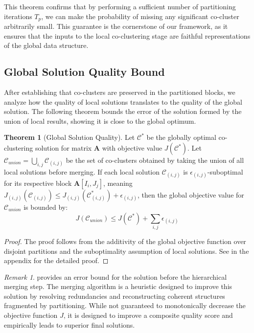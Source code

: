 \documentclass[journal]{IEEEtran}
\theoremstyle{definition}
\newtheorem{theorem}{Theorem}
\theoremstyle{remark} %
\newtheorem{remark}{Remark}
\begin{document}
{This theorem confirms that by performing a sufficient number of partitioning iterations $T_p$, we can make the probability of missing any significant co-cluster arbitrarily small. This guarantee is the cornerstone of our framework, as it ensures that the inputs to the local co-clustering stage are faithful representations of the global data structure.

\subsection{Global Solution Quality Bound}
\label{subsec:global-solution-quality-bound}
After establishing that co-clusters are preserved in the partitioned blocks, we analyze how the quality of local solutions translates to the quality of the global solution. The following theorem bounds the error of the solution formed by the union of local results, showing it is close to the global optimum.

\begin{theorem}[Global Solution Quality]
    \label{thm:global-solution-quality}
    Let $\mathcal{C}^*$ be the globally optimal co-clustering solution for matrix $\mathbf{A}$ with objective value $J(\mathcal{C}^*)$. Let $\mathcal{C}_{union} = \bigcup_{i,j} \mathcal{C}_{(i,j)}$ be the set of co-clusters obtained by taking the union of all local solutions before merging. If each local solution $\mathcal{C}_{(i,j)}$ is $\epsilon_{(i,j)}$-suboptimal for its respective block $\mathbf{A}[I_i, J_j]$, meaning $J_{(i,j)}(\mathcal{C}_{(i,j)}) \le J_{(i,j)}(\mathcal{C}_{(i,j)}^*) + \epsilon_{(i,j)}$, then the global objective value for $\mathcal{C}_{union}$ is bounded by:
    \begin{equation}
        J(\mathcal{C}_{union}) \le J(\mathcal{C}^*) + \sum_{i,j} \epsilon_{(i,j)}
    \end{equation}
\end{theorem}
\begin{proof}
    The proof follows from the additivity of the global objective function over disjoint partitions and the suboptimality assumption of local solutions. See  in the appendix for the detailed proof.
\end{proof}
\begin{remark}
     provides an error bound for the solution before the hierarchical merging step. The merging algorithm is a heuristic designed to improve this solution by resolving redundancies and reconstructing coherent structures fragmented by partitioning. While not guaranteed to monotonically decrease the objective function $J$, it is designed to improve a composite quality score and empirically leads to superior final solutions.
\end{remark}

}
\end{document}

